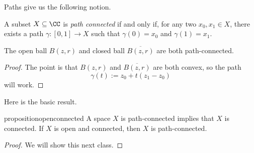 Paths give us the following notion.
\begin{definition}
	A subset $X\subseteq\CC$ is \textit{path connected} if and only if, for any two $x_0,x_1\in X$, there exists a path $\gamma:[0,1]\to X$ such that $\gamma(0)=x_0$ and $\gamma(1)=x_1$.
\end{definition}
\begin{lemma}
	The open ball $B(z,r)$ and closed ball $\overline{B(z,r)}$ are both path-connected.
\end{lemma}
\begin{proof}
	The point is that $B(z,r)$ and $\overline{B(z,r)}$ are both convex, so the path
	\[\gamma(t):=z_0+t(z_1-z_0)\]
	will work.
\end{proof}
Here is the basic result.
\begin{restatable}{proposition}{openconnected} \label{prop:getpathconnected}
	A space $X$ is path-connected implies that $X$ is connected. If $X$ is open and connected, then $X$ is path-connected.
\end{restatable}
\begin{proof}
	We will show this next class.
\end{proof}